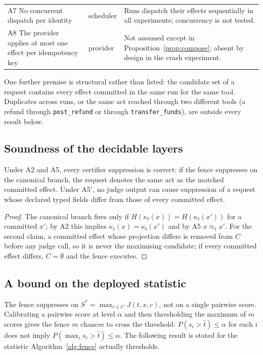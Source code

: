 {\begin{longtable}{@{}p{3.1cm}p{2.4cm}p{7.6cm}@{}}
A7 No concurrent dispatch per identity & scheduler & Runs dispatch their effects sequentially in all experiments; concurrency is not tested. \\
A8 The provider applies at most one effect per idempotency key & provider & Not assumed except in Proposition~\ref{prop:compose}; absent by design in the crash experiment. \\
\bottomrule
\end{longtable}}

One further premise is structural rather than listed: the candidate set of a request contains every effect committed in the same run for the same tool. Duplicates across runs, or the same act reached through two different tools (a refund through \texttt{post\_refund} or through \texttt{transfer\_funds}), are outside every result below.

\subsection{Soundness of the decidable layers}

\begin{proposition}\label{prop:sound}
Under A2 and A5, every certifier suppression is correct: if the fence suppresses on the canonical branch, the request denotes the same act as the matched committed effect. Under A5$'$, no judge output can cause suppression of a request whose declared typed fields differ from those of every committed effect.
\end{proposition}

\begin{proof}
The canonical branch fires only if $H(\kappa_t(x))=H(\kappa_t(x'))$ for a committed $x'$; by A2 this implies $\kappa_t(x)=\kappa_t(x')$ and by A5 $x\approx_t x'$. For the second claim, a committed effect whose projection differs is removed from $C$ before any judge call, so it is never the maximising candidate; if every committed effect differs, $C=\emptyset$ and the fence executes.
\end{proof}

\subsection{A bound on the deployed statistic}\label{sec:bound}

The fence suppresses on $S^\ast=\max_{c\in C}J(t,x,c)$, not on a single pairwise score. Calibrating a pairwise score at level $\alpha$ and then thresholding the maximum of $m$ scores gives the fence $m$ chances to cross the threshold: $P(s_i>\hat t)\le\alpha$ for each $i$ does not imply $P(\max_i s_i>\hat t)\le\alpha$. The following result is stated for the statistic Algorithm~\ref{alg:fence} actually thresholds.

